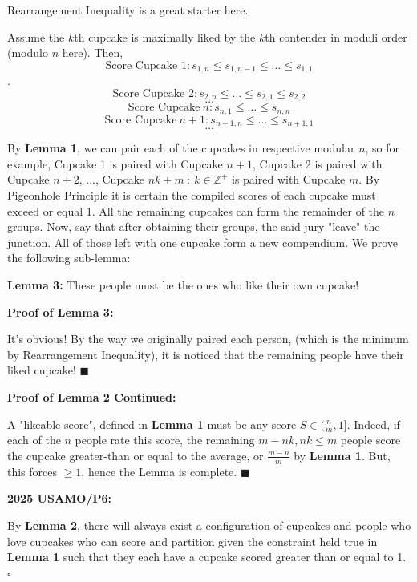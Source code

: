\begin{enumerate}
 Rearrangement Inequality is a great starter here.

 Assume the $k$th cupcake is maximally liked by the $k$th contender in moduli order (modulo $n$ here). Then,
 \[\text{Score Cupcake 1} : s_{1,n} \leq s_{1,n-1} \leq \dots \leq s_{1,1}\].
 \[\text{Score Cupcake 2}: s_{2,n} \leq \dots \leq s_{2,1} \leq s_{2,2}\]
 \[\dots\]
 \[\text{Score Cupcake} \ n: s_{n,1} \leq \dots \leq s_{n,n}\]
 \[\text{Score Cupcake} \ n+1: s_{n+1,n} \leq \dots \leq s_{n+1,1}\]
 \[\dots\]

 By \textbf{Lemma 1}, we can pair each of the cupcakes in respective modular $n$, so for example, Cupcake 1 is paired with Cupcake $n+1$, Cupcake 2 is paired with Cupcake $n+2$, ..., Cupcake $nk+m \ : \ k \in \mathbb{Z}^+$ is paired with Cupcake $m$. By Pigeonhole Principle it is certain the compiled scores of each cupcake must exceed or equal 1. All the remaining cupcakes can form the remainder of the $n$ groups. Now, say that after obtaining their groups, the said jury "leave" the junction. All of those left with one cupcake form a new compendium. We prove the following sub-lemma:

 \textbf{Lemma 3:} These people must be the ones who like their own cupcake!

 \textbf{Proof of Lemma 3:}

 It's obvious! By the way we originally paired each person, (which is the minimum by Rearrangement Inequality), it is noticed that the remaining people have their liked cupcake! $\blacksquare$

 \textbf{Proof of Lemma 2 Continued:}

 A "likeable score", defined in \textbf{Lemma 1} must be any score $S \in (\frac{n}{m}, 1]$. Indeed, if each of the $n$ people rate this score, the remaining $m-nk, nk \leq m$ people score the cupcake greater-than or equal to the average, or $\frac{m-n}{m}$ by \textbf{Lemma 1}. But, this forces $\geq 1$, hence the Lemma is complete. $\blacksquare$

 \textbf{2025 USAMO/P6:}

 By \textbf{Lemma 2}, there will always exist a configuration of cupcakes and people who love cupcakes who can score and partition given the constraint held true in \textbf{Lemma 1} such that they each have a cupcake scored greater than or equal to 1. $\square$



\end{enumerate}
